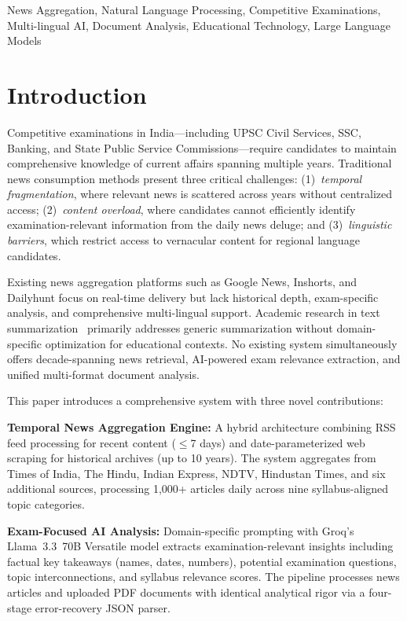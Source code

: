 \documentclass[conference]{IEEEtran}
\begin{document}
\begin{IEEEkeywords}
News Aggregation, Natural Language Processing, Competitive Examinations, Multi-lingual AI, Document Analysis, Educational Technology, Large Language Models
\end{IEEEkeywords}

\section{Introduction}

Competitive examinations in India—including UPSC Civil Services, SSC, Banking, and State Public Service Commissions—require candidates to maintain comprehensive knowledge of current affairs spanning multiple years. Traditional news consumption methods present three critical challenges: (1)~\textit{temporal fragmentation}, where relevant news is scattered across years without centralized access; (2)~\textit{content overload}, where candidates cannot efficiently identify examination-relevant information from the daily news deluge; and (3)~\textit{linguistic barriers}, which restrict access to vernacular content for regional language candidates.

Existing news aggregation platforms such as Google News, Inshorts, and Dailyhunt focus on real-time delivery but lack historical depth, exam-specific analysis, and comprehensive multi-lingual support. Academic research in text summarization~\cite{allahyari2017text, alomari2022deep} primarily addresses generic summarization without domain-specific optimization for educational contexts. No existing system simultaneously offers decade-spanning news retrieval, AI-powered exam relevance extraction, and unified multi-format document analysis.

This paper introduces a comprehensive system with three novel contributions:

\textbf{Temporal News Aggregation Engine:} A hybrid architecture combining RSS feed processing for recent content ($\leq$7 days) and date-parameterized web scraping for historical archives (up to 10 years). The system aggregates from Times of India, The Hindu, Indian Express, NDTV, Hindustan Times, and six additional sources, processing 1{,}000+ articles daily across nine syllabus-aligned topic categories.

\textbf{Exam-Focused AI Analysis:} Domain-specific prompting with Groq's Llama~3.3~70B Versatile model extracts examination-relevant insights including factual key takeaways (names, dates, numbers), potential examination questions, topic interconnections, and syllabus relevance scores. The pipeline processes news articles and uploaded PDF documents with identical analytical rigor via a four-stage error-recovery JSON parser.
\end{document}

